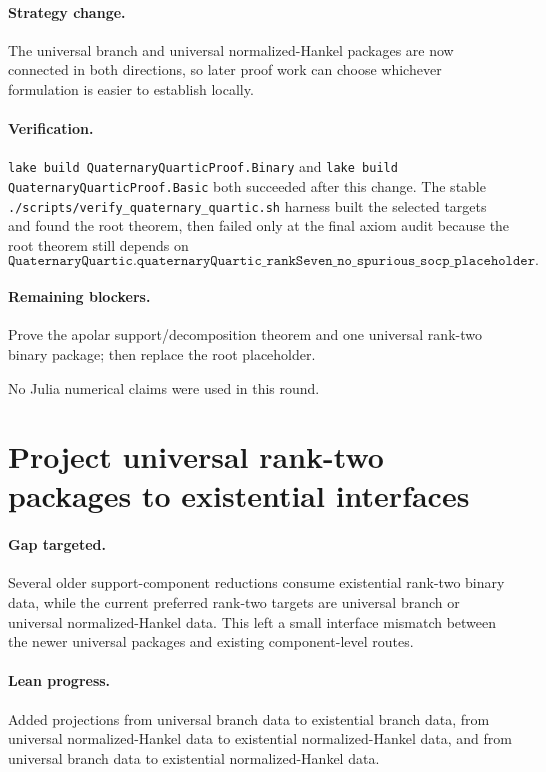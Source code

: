 \documentclass[11pt]{article}
\begin{document}
\paragraph{Strategy change.}
The universal branch and universal normalized-Hankel packages are now connected
in both directions, so later proof work can choose whichever formulation is
easier to establish locally.

\paragraph{Verification.}
\texttt{lake build QuaternaryQuarticProof.Binary} and
\texttt{lake build QuaternaryQuarticProof.Basic} both succeeded after this
change.  The stable \texttt{./scripts/verify\_quaternary\_quartic.sh} harness
built the selected targets and found the root theorem, then failed only at the
final axiom audit because the root theorem still depends on
\[
\texttt{QuaternaryQuartic.quaternaryQuartic\_rankSeven\_no\_spurious\_socp\_placeholder}.
\]

\paragraph{Remaining blockers.}
Prove the apolar support/decomposition theorem and one universal rank-two
binary package; then replace the root placeholder.

No Julia numerical claims were used in this round.

\section*{Project universal rank-two packages to existential interfaces}

\paragraph{Gap targeted.}
Several older support-component reductions consume existential rank-two binary
data, while the current preferred rank-two targets are universal branch or
universal normalized-Hankel data.  This left a small interface mismatch between
the newer universal packages and existing component-level routes.

\paragraph{Lean progress.}
Added projections from universal branch data to existential branch data, from
universal normalized-Hankel data to existential normalized-Hankel data, and from
universal branch data to existential normalized-Hankel data.
\end{document}

